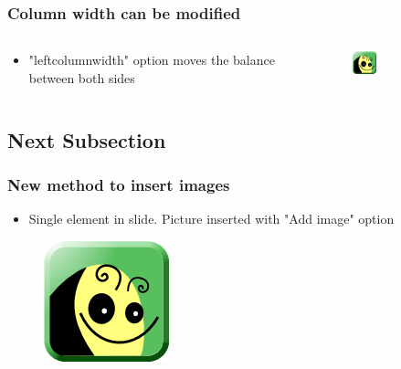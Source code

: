 \documentclass[usepdftitle=false,professionalfonts,compress ]{beamer}
\begin{document}
{
\begin{frame}\frametitle{Column width can be modified}
\begin{columns}
	\begin{column}{0.9\textwidth}


	\begin{itemize}

	\item "leftcolumnwidth" option moves the balance between both sides

		
				\end{itemize}
	\end{column}
	\begin{column}{0.27999999999999997\textwidth}

\begin{figure}
	\includegraphics[width=0.3\textwidth]{freeplane-logo-2014.png}\end{figure}\end{column}
\end{columns}

\end{frame}
}






\subsection{Next Subsection}

{
\begin{frame}\frametitle{New method to insert images}


	\begin{itemize}

	\item Single element in slide. Picture inserted with "Add image" option

				\end{itemize}

\begin{figure}
	\includegraphics[height=0.7\textheight]{freeplane-logo-2014.png}\end{figure}
\end{frame}
}
\end{document}
